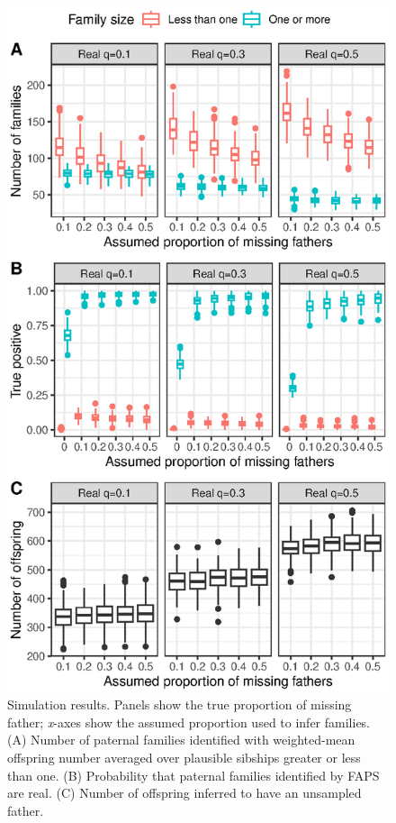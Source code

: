 \documentclass[10pt, a4paper, twocolumn]{article} %
\begin{document}
\begin{figure}
    \centering
    \includegraphics{simulations.eps}
    \caption{
        Simulation results.
        Panels show the true proportion of missing father; \textit{x}-axes show the assumed proportion used to infer families.
        (A) Number of paternal families identified with weighted-mean offspring number averaged over plausible sibships greater or less than one.
        (B) Probability that paternal families identified by FAPS are real.
        (C) Number of offspring inferred to have an unsampled father.
    }
    \label{fig:simulations}
\end{figure}
\end{document}
